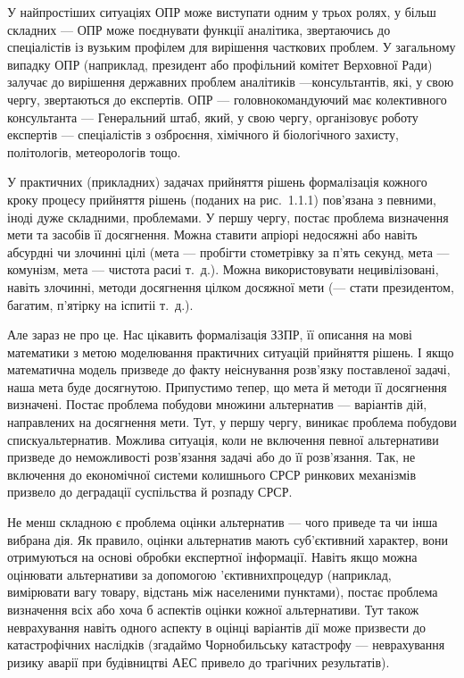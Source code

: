 \documentclass[a4paper, 12pt]{article}
\begin{document}
У найпростіших ситуаціях ОПР може виступати одним у трьох ролях, у більш складних --- ОПР може поєднувати функції аналітика, звертаючись до спеціалістів із вузьким профілем для вирішення часткових проблем. У загальному випадку ОПР (наприклад, президент або профільний комітет Верховної Ради) залучає до вирішення державних проблем аналітиків ---консультантів, які, у свою чергу, звертаються до експертів. ОПР --- головнокомандуючий має колективного консультанта --- Генеральний штаб, який, у свою чергу, організовує роботу експертів --- спеціалістів з озброєння, хімічного й біологічного захисту, політологів, метеорологів тощо. \medskip

У практичних (прикладних) задачах прийняття рішень формалізація кожного кроку процесу прийняття рішень (поданих на рис.~1.1.1) пов'язана з певними, іноді дуже складними, проблемами. У першу чергу, постає проблема визначення мети та засобів її досягнення. Можна ставити апріорі недосяжні або навіть абсурдні чи злочинні цілі ( мета --- пробігти стометрівку за п'ять секунд\guillemotright,  мета --- комунізм\guillemotright,  мета --- чистота раси\guillemotright і т.~д.). Можна використовувати нецивілізовані, навіть злочинні, методи досягнення цілком досяжної мети ( --- стати президентом\guillemotright,  багатим\guillemotright,  п'ятірку на іспиті\guillemotright і т.~д.). \medskip

Але зараз не про це. Нас цікавить формалізація ЗЗПР, її описання на мові математики з метою моделювання практичних ситуацій прийняття рішень. І якщо математична модель призведе до факту неіснування розв'язку поставленої задачі, наша мета буде досягнутою. Припустимо тепер, що мета й методи її досягнення визначені. Постає проблема побудови множини альтернатив --- варіантів дій, направлених на досягнення мети. Тут, у першу чергу, виникає проблема побудови  списку\guillemotright альтернатив. Можлива ситуація, коли не включення певної альтернативи призведе до неможливості розв'язання задачі або до її \guillemotright розв'язання. Так, не включення до економічної системи колишнього СРСР ринкових механізмів призвело до деградації суспільства й розпаду СРСР. \medskip

Не менш складною є проблема оцінки альтернатив ---  чого приведе та чи інша вибрана дія\guillemotright. Як правило, оцінки альтернатив мають суб'єктивний характер, вони отримуються на основі обробки експертної інформації. Навіть якщо можна оцінювати альтернативи за допомогою 'єктивних\guillemotright процедур (наприклад, вимірювати вагу товару, відстань між населеними пунктами), постає проблема визначення всіх або хоча б \guillemotright аспектів оцінки кожної альтернативи. Тут також неврахування навіть одного аспекту в оцінці варіантів дії може призвести до катастрофічних наслідків (згадаймо Чорнобильську катастрофу --- неврахування ризику аварії при будівництві АЕС привело до трагічних результатів). \medskip
\end{document}
